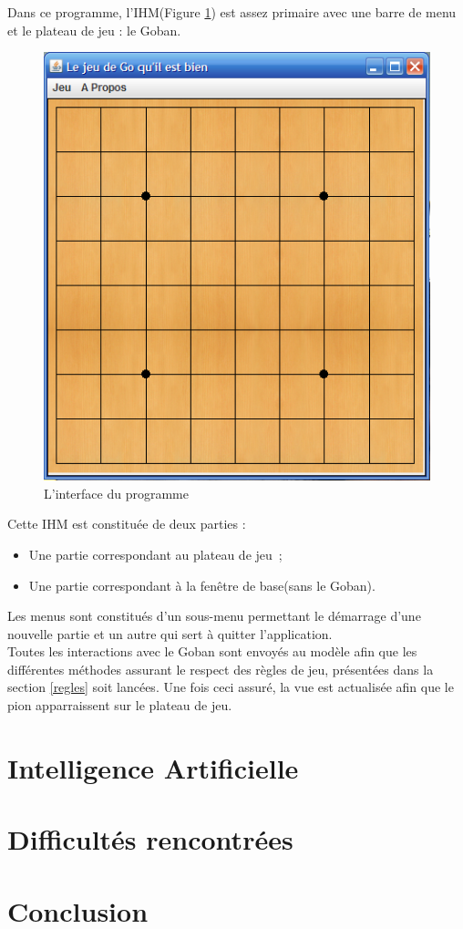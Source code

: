 \documentclass[11pt,a4paper]{article}
\begin{document}
Dans ce programme, l'IHM(Figure \ref{IHM_Vide}) est assez primaire avec une
barre de menu et le plateau de jeu :  le Goban.\\

	\begin{figure}[!ht]
    	\begin{center}
			\includegraphics[scale=0.5]{IHM_Vide.png}
		\end{center}
	\caption{L'interface du programme}
	\label{IHM_Vide}
	\end{figure}

Cette IHM est constituée de deux parties :

	\begin{itemize}
  		\item Une partie correspondant au plateau de jeu~; 
		\item Une partie correspondant à la fenêtre de base(sans le Goban).\\
    \end{itemize}
    
Les menus sont constitués d'un sous-menu permettant le démarrage d'une nouvelle
partie et un autre qui sert à quitter l'application.\\

Toutes les interactions avec le Goban sont envoyés au modèle afin que les
différentes méthodes assurant le respect des règles de jeu, présentées dans la
section \ref{regles} soit lancées. Une fois ceci assuré, la vue est
actualisée afin que le pion apparraissent sur le plateau de jeu.
\clearpage
\section{Intelligence Artificielle}

\clearpage
\section{Difficultés rencontrées}

\clearpage
\section{Conclusion}
\end{document}
